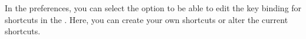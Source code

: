 In the  preferences, you can select the  option to be able to edit the key binding for shortcuts in the \ite{}. Here, you can create your own shortcuts or alter the current shortcuts. 
